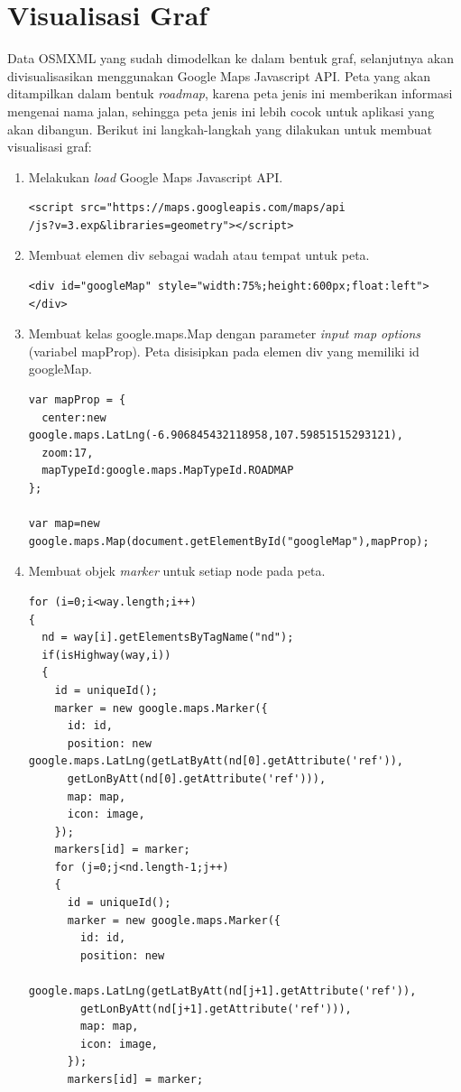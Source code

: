 \section{Visualisasi Graf} \label{ssec:analisis_gmap}
Data OSMXML yang sudah dimodelkan ke dalam bentuk graf, selanjutnya akan
divisualisasikan menggunakan Google Maps Javascript API. Peta yang akan
ditampilkan dalam bentuk \textit{roadmap}, karena peta jenis ini memberikan 
informasi mengenai nama jalan, sehingga peta jenis ini lebih cocok untuk aplikasi 
yang akan dibangun. Berikut ini langkah-langkah yang dilakukan untuk membuat
visualisasi graf:
\begin{enumerate}
  \item Melakukan \textit{load} Google Maps Javascript API.
\begin{verbatim}
<script src="https://maps.googleapis.com/maps/api
/js?v=3.exp&libraries=geometry"></script>
\end{verbatim}

  \item Membuat elemen div sebagai wadah atau tempat untuk peta.
\begin{verbatim}
<div id="googleMap" style="width:75%;height:600px;float:left"></div>
\end{verbatim}
  
  \item Membuat kelas google.maps.Map dengan parameter \textit{input map
  options} (variabel mapProp). Peta disisipkan pada elemen div yang memiliki id
  googleMap.
\begin{verbatim}
var mapProp = {
  center:new google.maps.LatLng(-6.906845432118958,107.59851515293121),
  zoom:17,
  mapTypeId:google.maps.MapTypeId.ROADMAP
};

var map=new google.maps.Map(document.getElementById("googleMap"),mapProp);
\end{verbatim}

  \item Membuat objek \textit{marker} untuk setiap node pada peta.
\begin{verbatim}
for (i=0;i<way.length;i++)
{
  nd = way[i].getElementsByTagName("nd");
  if(isHighway(way,i))
  {
    id = uniqueId();
    marker = new google.maps.Marker({
      id: id,
      position: new google.maps.LatLng(getLatByAtt(nd[0].getAttribute('ref')),
      getLonByAtt(nd[0].getAttribute('ref'))),
      map: map,
      icon: image,
    });
    markers[id] = marker;
    for (j=0;j<nd.length-1;j++)
    {
      id = uniqueId();
      marker = new google.maps.Marker({
        id: id,
        position: new
        google.maps.LatLng(getLatByAtt(nd[j+1].getAttribute('ref')), 
        getLonByAtt(nd[j+1].getAttribute('ref'))), 
        map: map, 
        icon: image,
      });
      markers[id] = marker;
\end{verbatim}


\end{enumerate}
